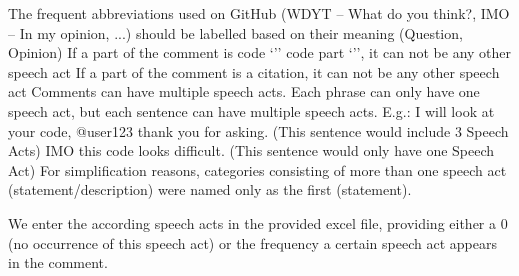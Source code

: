 The frequent abbreviations used on GitHub (WDYT – What do you think?, IMO – In my opinion, ...)
should be labelled based on their meaning (Question, Opinion)
If a part of the comment is code ‘’’ code part ‘’’, it can not be any other speech act
If a part of the comment is a citation, it can not be any other speech act
Comments can have multiple speech acts. Each phrase can only have one speech act, but each
sentence can have multiple speech acts.
E.g.:
I will look at your code, @user123 thank you for asking. (This sentence would include 3 Speech Acts)
IMO this code looks difficult. (This sentence would only have one Speech Act)
For simplification reasons, categories consisting of more than one speech act (statement/description)
were named only as the first (statement).

We enter the according speech acts in the provided excel file, providing either a 0 (no occurrence
of this speech act) or the frequency a certain speech act appears in the comment.



